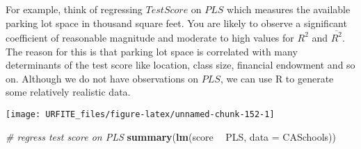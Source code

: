 \documentclass[]{book}
\newenvironment{Shaded}{\begin{snugshade}}{\end{snugshade}}
\newcommand{\KeywordTok}[1]{\textcolor[rgb]{0.13,0.29,0.53}{\textbf{#1}}}
\newcommand{\DataTypeTok}[1]{\textcolor[rgb]{0.13,0.29,0.53}{#1}}
\newcommand{\DecValTok}[1]{\textcolor[rgb]{0.00,0.00,0.81}{#1}}
\newcommand{\FloatTok}[1]{\textcolor[rgb]{0.00,0.00,0.81}{#1}}
\newcommand{\StringTok}[1]{\textcolor[rgb]{0.31,0.60,0.02}{#1}}
\newcommand{\CommentTok}[1]{\textcolor[rgb]{0.56,0.35,0.01}{\textit{#1}}}
\newcommand{\OperatorTok}[1]{\textcolor[rgb]{0.81,0.36,0.00}{\textbf{#1}}}
\newcommand{\NormalTok}[1]{#1}
\theoremstyle{definition}
\theoremstyle{definition}
\theoremstyle{definition}
\theoremstyle{remark}
\begin{document}
For example, think of regressing \(TestScore\) on \(PLS\) which measures
the available parking lot space in thousand square feet. You are likely
to observe a significant coefficient of reasonable magnitude and
moderate to high values for \(R^2\) and \(\overline{R^2}\). The reason
for this is that parking lot space is correlated with many determinants
of the test score like location, class size, financial endowment and so
on. Although we do not have observations on \(PLS\), we can use R to
generate some relatively realistic data.

\begin{Shaded}
\end{Shaded}

\begin{center}\texttt{[image: URFITE\_files/figure-latex/unnamed-chunk-152-1]} \end{center}

\begin{Shaded}
\begin{Highlighting}[]
\CommentTok{# regress test score on PLS}
\KeywordTok{summary}\NormalTok{(}\KeywordTok{lm}\NormalTok{(score }\OperatorTok{~}\StringTok{ }\NormalTok{PLS, }\DataTypeTok{data =}\NormalTok{ CASchools))}
\end{Highlighting}
\end{Shaded}
\end{document}
